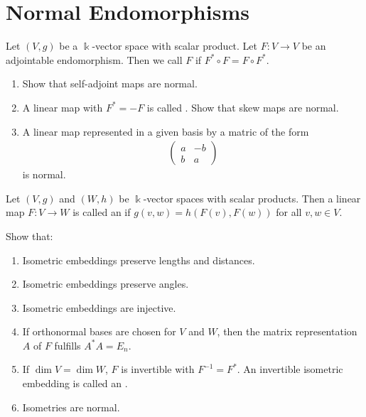 \chapter{Normal Endomorphisms}
\begin{importantdefinition}{}{}
	Let $(V,g)$ be a $\Bbbk$-vector space with scalar product. Let $F : V \to V$ be an adjointable endomorphism. Then we call $F$  if $F^* \circ F = F \circ F^*$.
\end{importantdefinition}
\begin{exercise}
	\begin{enumerate}
		\item Show that self-adjoint maps are normal.
		\item A linear map with $F^* = -F$ is called . Show that skew maps are normal.
		\item A linear map represented in a given basis by a matric of the form
		\begin{align*}
			\begin{pmatrix}
				a & -b\\
				b & a
			\end{pmatrix}
		\end{align*}
		is normal.
	\end{enumerate}
\end{exercise}
\begin{importantdefinition}{}{}
		Let $(V,g)$ and $(W,h)$ be $\Bbbk$-vector spaces with scalar products. Then a linear map $F : V \to W$ is called an  if $g(v,w) = h(F(v), F(w))$ for all $v,w \in V$.
\end{importantdefinition}
\begin{exercise}
	Show that:
	\begin{enumerate}
		\item Isometric embeddings preserve lengths and distances.
		\item Isometric embeddings preserve angles.
		\item Isometric embeddings are injective.
		\item If orthonormal bases are chosen for $V$ and $W$, then the matrix representation $A$ of $F$ fulfills $A^*A = E_n$.
		\item If $\dim V = \dim W$, $F$ is invertible with $F^{-1} = F^*$. An invertible isometric embedding is called an .
		\item Isometries are normal.
	\end{enumerate}
\end{exercise}
